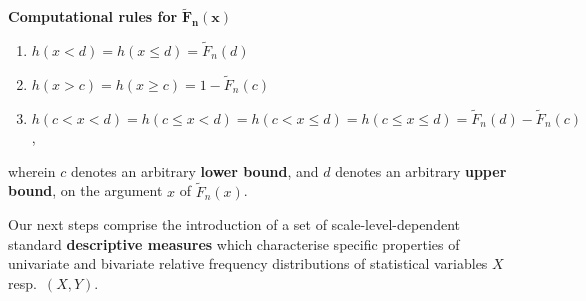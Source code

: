 \medskip
\noindent
\textbf{Computational rules for} $\boldsymbol{\tilde{F}_{n}(x)}$
%
\begin{enumerate}

\item $h(x<d)=h(x\leq d) = \tilde{F}_{n}(d)$

\item $h(x>c)=h(x\geq c) = 1-\tilde{F}_{n}(c)$

\item $h(c<x<d) = h(c\leq x<d) = h(c<x\leq d)
= h(c\leq x\leq d) = \tilde{F}_{n}(d)-\tilde{F}_{n}(c)$,
\end{enumerate}
%
wherein $c$ denotes an arbitrary \textbf{lower bound}, and $d$ 
denotes an arbitrary \textbf{upper bound}, on the argument $x$ of
$\tilde{F}_{n}(x)$.

\vspace{5mm}
\noindent
Our next steps comprise the introduction of a set of 
scale-level-dependent standard \textbf{descriptive measures} which 
characterise specific properties of univariate and bivariate 
relative frequency distributions of statistical variables $X$ 
resp.\ $(X,Y)$.

